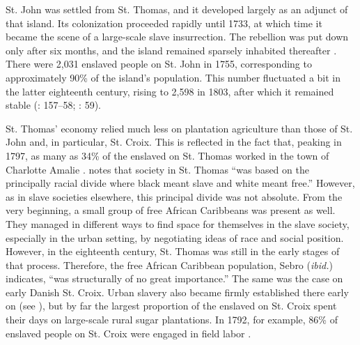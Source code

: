 \documentclass[output=paper,colorlinks,citecolor=brown]{langscibook}
\begin{document}
St. John was settled from St. Thomas, and it developed largely as an adjunct of that island. Its colonization proceeded rapidly until 1733, at which time it became the scene of a large-scale slave insurrection. The rebellion was put down only after six months, and the island remained sparsely inhabited thereafter \citep[91--96]{Hornby_1980}. There were 2,031 enslaved people on St. John in 1755, corresponding to approximately 90\% of the island’s population. This number fluctuated a bit in the latter eighteenth century, rising to 2,598 in 1803, after which it remained stable (\cite{GreenPedersen_1971}: 157–58; \cite{Gobel_Sebro_2017}: 59).

St. Thomas' economy relied much less on plantation agriculture than those of St. John and, in particular, St. Croix. This is reflected in the fact that, peaking in 1797, as many as 34\% of the enslaved on St. Thomas worked in the town of Charlotte Amalie \citep[234]{GreenPedersen_1981}. \citet[128]{Sebro_2016} notes that society in St. Thomas ``was based on the principally racial divide where black meant slave and white meant free.'' However, as in slave societies elsewhere, this principal divide was not absolute. From the very beginning, a small group of free African Caribbeans was present as well. They managed in different ways to find space for themselves in the slave society, especially in the urban setting, by negotiating ideas of race and social position. However, in the eighteenth century, St. Thomas was still in the early stages of that process. Therefore, the free African Caribbean population, Sebro (\emph{ibid.}) indicates, ``was structurally of no great importance.'' The same was the case on early Danish St. Croix. Urban slavery also became firmly established there early on (see \cite{Tyson_2011}), but by far the largest proportion of the enslaved on St. Croix spent their days on large-scale rural sugar plantations. In 1792, for example, 86\% of enslaved people on St. Croix were engaged in field labor \citep[75]{Hall_1992}.
\end{document}

